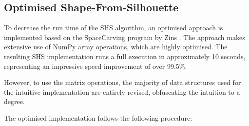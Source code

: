 \newpage
\subsection{Optimised Shape-From-Silhouette}

To decrease the run time of the SHS algorithm, an optimised approach is implemented based on the SpaceCarving program by Zins \cite{zins_2019}. The approach makes extensive use of NumPy array operations, which are highly optimised. The resulting SHS implementation runs a full execution in approximately 10 seconds, representing an impressive speed improvement of over 99.5\%.

However, to use the matrix operations, the majority of data structures used for the intuitive implementation are entirely revised, obfuscating the intuition to a degree.

The optimised implementation follows the following procedure:

